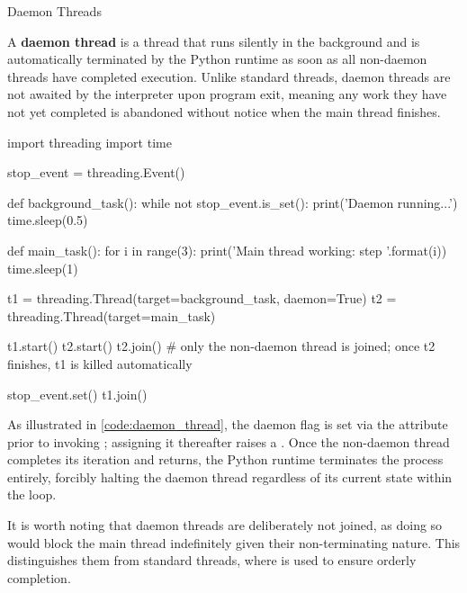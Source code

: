 \documentclass[10pt]{article}
\begin{document}
      \begin{core}{Daemon Threads}

        A \textbf{daemon thread} is a thread that runs silently in the background and is automatically terminated by the Python runtime as soon as all non-daemon threads have completed execution. Unlike standard threads, daemon threads are not awaited by the interpreter upon program exit, meaning any work they have not yet completed is abandoned without notice when the main thread finishes.

        \begin{pyconsole}

          import threading
          import time

          stop_event = threading.Event()

          def background_task():
              while not stop_event.is_set():
                  print('Daemon running...')
                  time.sleep(0.5)

          def main_task():
              for i in range(3):
                  print('Main thread working: step {}'.format(i))
                  time.sleep(1)

          t1 = threading.Thread(target=background_task, daemon=True)
          t2 = threading.Thread(target=main_task)

          t1.start()
          t2.start()
          t2.join() # only the non-daemon thread is joined; once t2 finishes, t1 is killed automatically

          stop_event.set()
          t1.join()

        \end{pyconsole}

        As illustrated in \autoref{code:daemon_thread}, the daemon flag is set via the  attribute prior to invoking ; assigning it thereafter raises a . Once the non-daemon thread  completes its iteration and  returns, the Python runtime terminates the process entirely, forcibly halting the daemon thread  regardless of its current state within the  loop.

        It is worth noting that daemon threads are deliberately not joined, as doing so would block the main thread indefinitely given their non-terminating nature. This distinguishes them from standard threads, where  is used to ensure orderly completion.

      \end{core}
\end{document}
